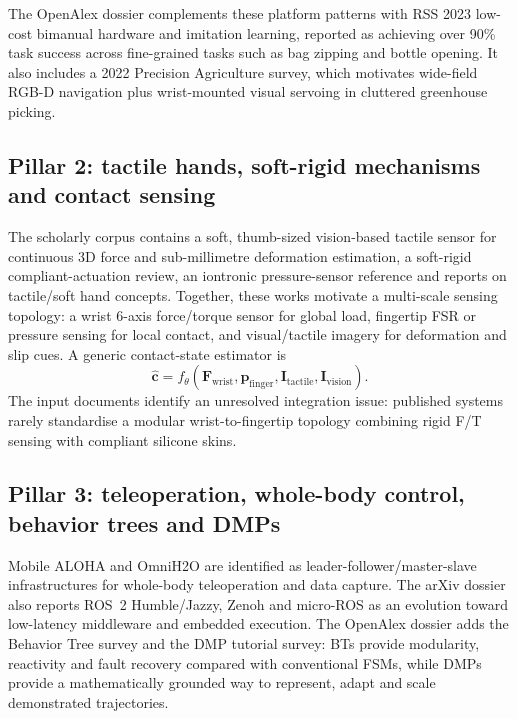 \documentclass[10pt,a4paper]{article}
\begin{document}
The OpenAlex dossier complements these platform patterns with RSS 2023 low-cost bimanual hardware and imitation learning, reported as achieving over 90\% task success across fine-grained tasks such as bag zipping and bottle opening. It also includes a 2022 Precision Agriculture survey, which motivates wide-field RGB-D navigation plus wrist-mounted visual servoing in cluttered greenhouse picking.\cite{zhao,zhou}

\subsection{Pillar 2: tactile hands, soft-rigid mechanisms and contact sensing}
The scholarly corpus contains a soft, thumb-sized vision-based tactile sensor for continuous 3D force and sub-millimetre deformation estimation, a soft-rigid compliant-actuation review, an iontronic pressure-sensor reference and reports on tactile/soft hand concepts.\cite{sun,xavier,yang} Together, these works motivate a multi-scale sensing topology: a wrist 6-axis force/torque sensor for global load, fingertip FSR or pressure sensing for local contact, and visual/tactile imagery for deformation and slip cues. A generic contact-state estimator is
\begin{equation}
\hat{\mathbf{c}}=f_{\theta}\left(\mathbf{F}_{\mathrm{wrist}},\mathbf{p}_{\mathrm{finger}},\mathbf{I}_{\mathrm{tactile}},\mathbf{I}_{\mathrm{vision}}\right).
\label{eq:contact}
\end{equation}
The input documents identify an unresolved integration issue: published systems rarely standardise a modular wrist-to-fingertip topology combining rigid F/T sensing with compliant silicone skins.

\subsection{Pillar 3: teleoperation, whole-body control, behavior trees and DMPs}
Mobile ALOHA and OmniH2O are identified as leader-follower/master-slave infrastructures for whole-body teleoperation and data capture.\cite{mobilealoha,omnih2o} The arXiv dossier also reports ROS~2 Humble/Jazzy, Zenoh and micro-ROS as an evolution toward low-latency middleware and embedded execution. The OpenAlex dossier adds the Behavior Tree survey and the DMP tutorial survey: BTs provide modularity, reactivity and fault recovery compared with conventional FSMs, while DMPs provide a mathematically grounded way to represent, adapt and scale demonstrated trajectories.\cite{iovino,saveriano}
\end{document}

